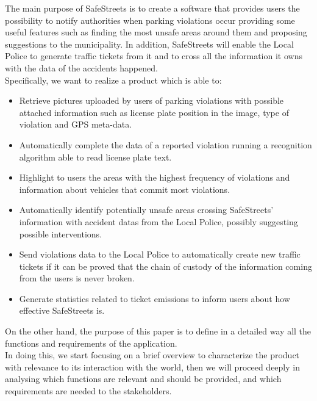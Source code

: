The main purpose of SafeStreets is to create a software that provides users the possibility to notify	
authorities	when parking violations occur providing some useful features such as finding the most unsafe areas around them and proposing suggestions to the municipality. In addition, SafeStreets will enable the Local Police to generate traffic tickets from it and to cross all the information it owns with the data of the accidents happened.\\
Specifically, we want to realize a product which is able to:
\begin{itemize}
	
	\item Retrieve pictures uploaded by users of parking violations with possible attached information such as license plate position in the image, type of violation and GPS meta-data.
	
	\item Automatically complete the data of a reported violation running a recognition algorithm able to read license plate text.
	
	\item Highlight to users the areas with the highest frequency of violations and information about vehicles that commit most violations.
	
	\item Automatically identify	potentially unsafe	areas crossing SafeStreets' information with accident datas from the Local Police, possibly	suggesting	possible	interventions.
	
	\item Send violations data to the Local Police to automatically create new traffic tickets if it can be proved that the	chain	of	custody	of	the	information	coming	from	the	users	is	never	broken.
	
	\item Generate statistics related to ticket emissions to inform users about how effective SafeStreets is.
	
\end{itemize}

On the other hand, the purpose of this paper is to define in a detailed way all the functions and requirements of the application.\\ In doing this, we start focusing on a brief overview to characterize the product with relevance to its interaction with the world, then we will proceed deeply in analysing which functions are relevant and should be provided, and which requirements are needed to the stakeholders. 
